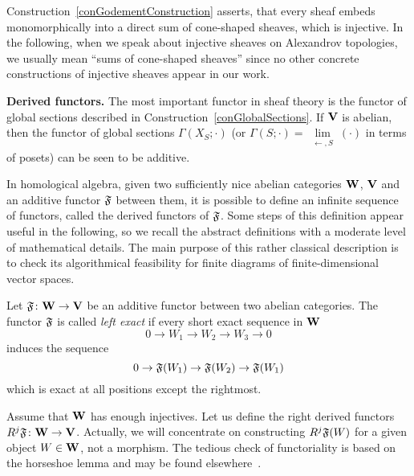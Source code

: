 \begin{rem}\label{remInjIsSumOfCones}
Construction~\ref{conGodementConstruction} asserts, that every sheaf embeds monomorphically into a direct sum of cone-shaped sheaves, which is injective. In the following, when we speak about injective sheaves on Alexandrov topologies, we usually mean ``sums of cone-shaped sheaves'' since no other concrete constructions of injective sheaves appear in our work.
\end{rem}

\textbf{Derived functors.} The most important functor in sheaf theory is the functor of global sections described in Construction~\ref{conGlobalSections}. If $\mathbf{V}$ is abelian, then the functor of global sections $\Gamma(X_S;\cdot)$ (or $\Gamma(S;\cdot)=\lim\limits_{\substack{\leftarrow, S}}(\cdot)$ in terms of posets) can be seen to be additive.

In homological algebra, given two sufficiently nice abelian categories $\mathbf{W}$, $\mathbf{V}$ and an additive functor $\mathfrak{F}$ between them, it is possible to define an infinite sequence of functors, called the derived functors of $\mathfrak{F}$. %
Some steps of this definition appear useful in the following, so we recall the abstract definitions with a moderate level of mathematical details. The main purpose of this rather classical description is to check its algorithmical feasibility for finite diagrams of finite-dimensional vector spaces.

\begin{defin}\label{definExactFunctor}
Let $\mathfrak{F}\colon \mathbf{W}\to \mathbf{V}$ be an additive functor between two abelian categories. The functor $\mathfrak{F}$ is called \emph{left exact} if every short exact sequence in $\mathbf{W}$
\[
0\to W_1 \to W_2\to W_3\to 0
\]
induces the sequence
\begin{equation}\label{eqLeftExact}
0\to \mathfrak{F}(W_1) \to \mathfrak{F}(W_2) \to \mathfrak{F}(W_1)
\end{equation}
which is exact at all positions except the rightmost.
\end{defin}

Assume that $\mathbf{W}$ has enough injectives. Let us define the right derived functors $R^j\mathfrak{F}\colon\mathbf{W}\to\mathbf{V}$. Actually, we will concentrate on constructing $R^j\mathfrak{F}(W)$ for a given object $W\in\mathbf{W}$, not a morphism. The tedious check of functoriality is based on the horseshoe lemma and may be found elsewhere~\cite[Theorem 2.3.7]{weibel1994homalg}.

